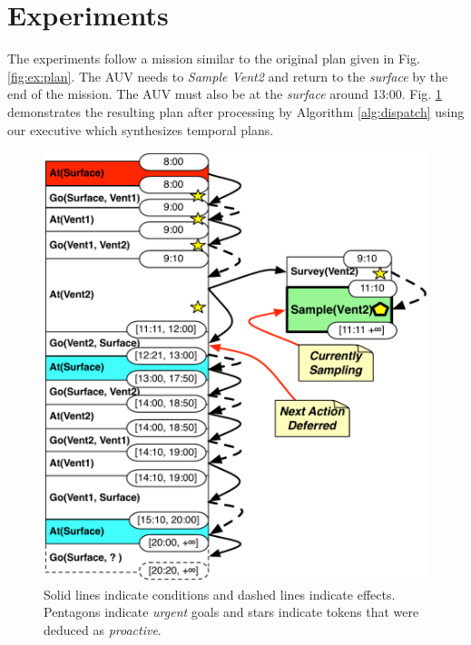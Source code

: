 \section{Experiments}
\label{sec:exp}

The experiments follow a mission similar to the original plan given in
Fig. \ref{fig:ex:plan}. The AUV needs to {\em Sample Vent2} and return
to the {\em surface} by the end of the mission. The AUV must also be
at the {\em surface} around
13:00. %
Fig. \ref{fig:ex:mixed1} demonstrates the resulting plan after
processing by Algorithm \ref{alg:dispatch} using our executive \rx
which synthesizes temporal plans.

\begin{figure}[!htbp]
  \centering
  \includegraphics[width=0.9\columnwidth]{figs/example_MixedInitial}
  \vskip-2mm
  \caption{\small Solid lines indicate conditions and dashed lines
    indicate effects. Pentagons indicate {\em urgent} goals and stars
    indicate tokens that were deduced as {\em proactive}.}
  \label{fig:ex:mixed1}
  \vskip-3mm
\end{figure}


